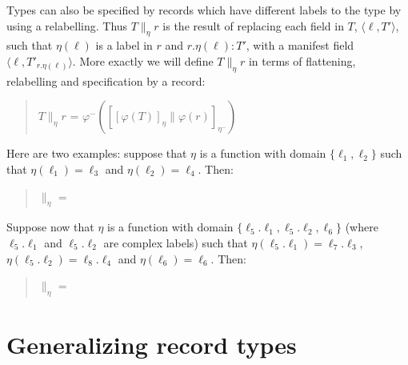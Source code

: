 Types can also be specified by records which have different labels to
the type by using a relabelling.  Thus $T\parallel_\eta r$ is the
result of replacing each field in $T$, $\langle\ell,T'\rangle$,  such
that $\eta(\ell)$ is a label in $r$ and $r.\eta(\ell):T'$, with a
manifest field$\langle\ell,T'_{r.\eta(\ell)}\rangle$.  More exactly we
will define $T\parallel_\eta r$ in terms of flattening, relabelling
and specification by a record:
\begin{quote}
$T\parallel_\eta r$ =
$\varphi^-([[\varphi(T)]_\eta\parallel\varphi(r)]_{\eta^-})$
\end{quote}
Here are two examples:  suppose that %
$\eta$ is a
function with domain $\{\ell_1,\ell_2\}$ such that
$\eta(\ell_1)=\ell_3$ and $\eta(\ell_2)=\ell_4$.  Then:
\begin{quote}
 $\parallel_\eta$ 
=
\end{quote}
Suppose now that %
$\eta$ is a
function with domain $\{\ell_5.\ell_1, \ell_5.\ell_2, \ell_6\}$ (where
$\ell_5.\ell_1$ and $\ell_5.\ell_2$ are complex labels) such that
$\eta(\ell_5.\ell_1)=\ell_7.\ell_3$,
$\eta(\ell_5.\ell_2)=\ell_8.\ell_4$ and $\eta(\ell_6)=\ell_6$.  Then:
\begin{quote}
 $\parallel_\eta$
 =
\begin{quote}
\end{quote}
\end{quote}  

\section{Generalizing record types}
\label{app:gen-rectypes}

